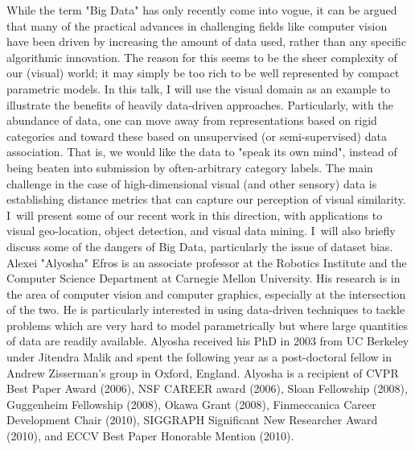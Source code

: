 \vspace{-2cm}
{
While the term "Big Data" has only recently come into vogue, it can be argued that many of the practical advances in challenging fields like computer vision have been driven by increasing the amount of data used, rather than any specific algorithmic innovation.  The reason for this seems to be the sheer complexity of our (visual) world; it may simply be too rich to be well represented by compact parametric models.  In this talk, I will use the visual domain as an example to illustrate the benefits of heavily data-driven approaches. Particularly, with the abundance of data, one can move away from representations based on rigid categories and toward these based on unsupervised (or semi-supervised) data association. That is, we would like the data to "speak its own mind", instead of being beaten into submission by often-arbitrary category labels.  The main challenge in the case of high-dimensional visual (and other sensory) data is establishing distance metrics that can capture our perception of visual 
similarity.  I~will present some of our recent work in this direction, with applications to visual geo-location, object detection, and visual data mining.  I~will also briefly discuss some of the dangers of Big Data, particularly the issue of dataset bias.
}{
Alexei "Alyosha" Efros is an associate professor at the Robotics Institute and the Computer Science Department at Carnegie Mellon University. His research is in the area of computer vision and computer graphics, especially at the intersection of the two. He is particularly interested in using data-driven techniques to tackle problems which are very hard to model parametrically but where large quantities of data are readily available. Alyosha received his PhD in 2003 from UC Berkeley under Jitendra Malik and spent the following year as a post-doctoral fellow in Andrew Zisserman's group in Oxford, England. Alyosha is a recipient of CVPR Best Paper Award (2006), NSF CAREER award (2006), Sloan Fellowship (2008), Guggenheim Fellowship (2008), Okawa Grant (2008), Finmeccanica Career Development Chair (2010), SIGGRAPH Significant New Researcher Award (2010), and ECCV Best Paper Honorable Mention (2010).
}





